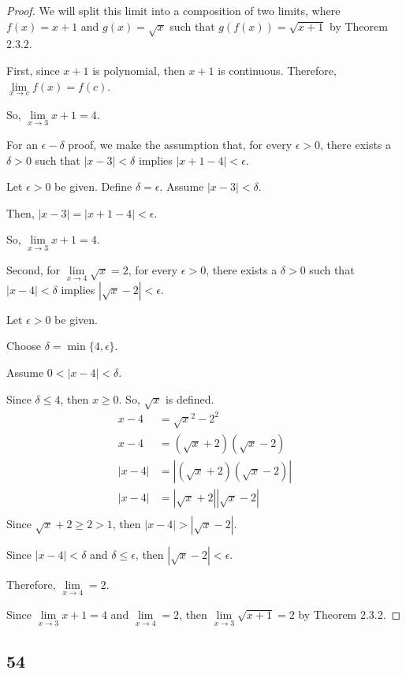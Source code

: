 \documentclass[../m134a-hw2.tex]{subfiles}
\begin{document}
\begin{proof}
    We will split this limit into a composition of two limits, where $f(x) = x + 1$ and $g(x) = \sqrt{x}$ such that $g(f(x)) = \sqrt{x+1}$ by Theorem 2.3.2. 

    First, since $x+1$ is polynomial, then $x+1$ is continuous. Therefore, $\lim\limits_{x \to c} f(x) = f(c)$.
    
    So, $\lim\limits_{x \to 3} x+1 = 4$.

    For an $\epsilon-\delta$ proof, we make the assumption that, for every $\epsilon > 0$, there exists a $\delta > 0$ such that $|x-3|<\delta$ implies $|x+1-4|<\epsilon$.

    Let $\epsilon>0$ be given.
    Define $\delta=\epsilon$.
    Assume $|x-3|<\delta$.
    
    Then, $|x-3|=|x+1-4|<\epsilon$.

    So, $\lim\limits_{x \to 3} x+1 = 4$.

    Second, for $\lim\limits_{x \to 4} \sqrt{x} = 2$, for every $\epsilon>0$, there exists a $\delta>0$ such that $|x-4|<\delta$ implies $|\sqrt{x}-2|<\epsilon$.

    Let $\epsilon>0$ be given.

    Choose $\delta = \min\{4,\epsilon\}$.

    Assume $0<|x-4|<\delta$.

    Since $\delta\leq4$, then $x\geq0$.
    So, $\sqrt{x}$ is defined.
    \begin{align*}
        x-4 &= {\sqrt{x}}^2-2^2 \\
        x-4 &= (\sqrt{x}+2)(\sqrt{x}-2) \\
        |x-4| &= \left|(\sqrt{x}+2)(\sqrt{x}-2)\right| \\
        |x-4| &= |\sqrt{x}+2||\sqrt{x}-2| \\
    \end{align*}
    Since $\sqrt{x}+2\geq2>1$, then $|x-4|>|\sqrt{x}-2|$.

    Since $|x-4|<\delta$ and $\delta\leq\epsilon$, then $|\sqrt{x}-2|<\epsilon$.

    Therefore, $\lim\limits_{x \to 4} = 2$.

    Since $\lim\limits_{x \to 3} x+1 = 4$ and $\lim\limits_{x \to 4} = 2$, then $\lim\limits_{x \to 3} \sqrt{x+1} = 2$ by Theorem 2.3.2.

\end{proof}

\subsection*{54}
\end{document}
